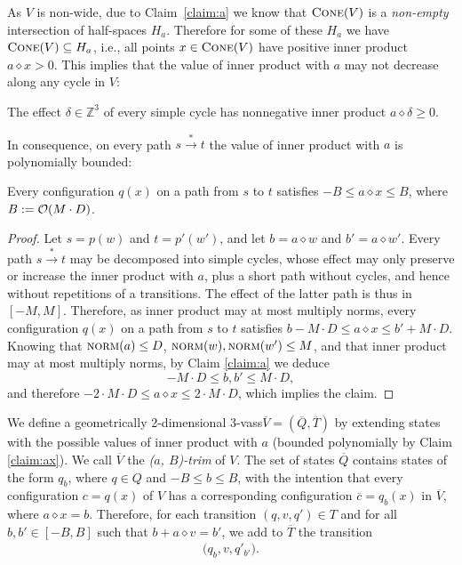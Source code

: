 \documentclass[a4paper, UKenglish, cleveref, autoref, thm-restate]{lipics-v2021}
\newcommand{\Z}{\mathbb{Z}}
\newcommand{\trans}[1]{\stackrel{#1}{\longrightarrow}}
\newcommand{\tran}{\trans{*}}
\newcommand{\norm}{\textsc{norm}}
\newcommand{\OO}{{\cal O}}
\newcommand{\mytrim}[2]{(#1, #2)-trim}
\newcommand{\vass}{{\sc vass}\xspace}
\newcommand{\tvass}{\parvass 3}
\newcommand{\geomvass}{geometrically 2-dimensional \tvass}
\newcommand{\parvass}[1]{{$#1$-\vass}\xspace}
\newcommand{\setfromto}[2]{[#1, #2]}
\newcommand{\cone}[1]{\textsc{Cone}(#1)}
\newcommand{\essdvass}[1]{\overline{#1}}
\newcommand{\innprod}[2]{#1 \diamond #2} \newcommand{\pair}[2]{#1_{#2}}
\begin{document}
As $V$ is non-wide, 
due to Claim~\ref{claim:a} we know that $\cone V$ is a \emph{non-empty} intersection of half-spaces $H_a$.
Therefore for some of these $H_a$ we have
$\cone V \subseteq H_a$, i.e.,
all points $x\in\cone V$ have positive inner product $\innprod a x > 0$.
This implies that
the value of  inner product with $a$ may not decrease along any cycle in $V$:
\begin{claim}\label{clm:inner_with_effect}
The effect $\delta\in\Z^3$ of every simple cycle has nonnegative inner product $\innprod a \delta \geq 0$.
\end{claim}
In consequence, on every path $s \tran t$ the value of inner product with $a$ is polynomially
bounded:
\begin{claim} \label{claim:ax}
Every configuration $q(x)$ on a path from $s$ to $t$ satisfies
$-B \leq \innprod a x \leq B$, where $B := \OO(M\cdot D)$. 
\end{claim}
\begin{proof}
Let $s=p(w)$ and $t=p'(w')$, and let $b = \innprod a w$ and $b' = \innprod a {w'}$.
Every path $s \tran t$ may be decomposed into simple cycles, whose effect may only preserve or increase
the inner product with $a$, plus a short path without cycles, and hence without repetitions of a transitions.
The effect of the latter path is thus in $[-M,M]$.
Therefore, as inner product may at most multiply norms, 
every configuration $q(x)$ on a path from $s$ to $t$ satisfies
$b-M \cdot D \leq \innprod a x \leq b'+M \cdot D$.
Knowing that $\norm(a)\leq D$, $\norm(w), \norm(w')\leq M$, 
and that inner product may at most multiply norms, 
by Claim \ref{claim:a} we deduce 
\[
-M\cdot D \leq b, b' \leq M\cdot D,
\]
and therefore
$-2\cdot M\cdot D \leq \innprod a x \leq 2\cdot M \cdot D$,
which implies the claim.
\end{proof}

We define a \geomvass $\essdvass V = (\essdvass Q, \essdvass T)$ 
by extending states with the possible values of inner product with $a$
(bounded polynomially by Claim \ref{claim:ax}).
We call $\essdvass V$ the \emph{\mytrim {$a$} {$B$}} of $V$. 
The set of states $\essdvass Q$ contains states of the form $\pair q b$, where $q\in Q$ and $-B \leq b \leq B$,
with the intention that every configuration
$c = q(x)$ of $V$ has a corresponding configuration 
$\essdvass c = \pair q b (x)$ in $\essdvass V$, 
where $\innprod a x = b$.
Therefore, for each transition $(q, v, q') \in T$
and for all $b, b'\in \setfromto{-B} B$
such that $b + \innprod a v = b'$,
we add to $\essdvass T$ the transition
\begin{align} \label{eq:tranV}
\big(\pair q b, v, \pair {q'} {b'}\big).
\end{align}
\end{document}
